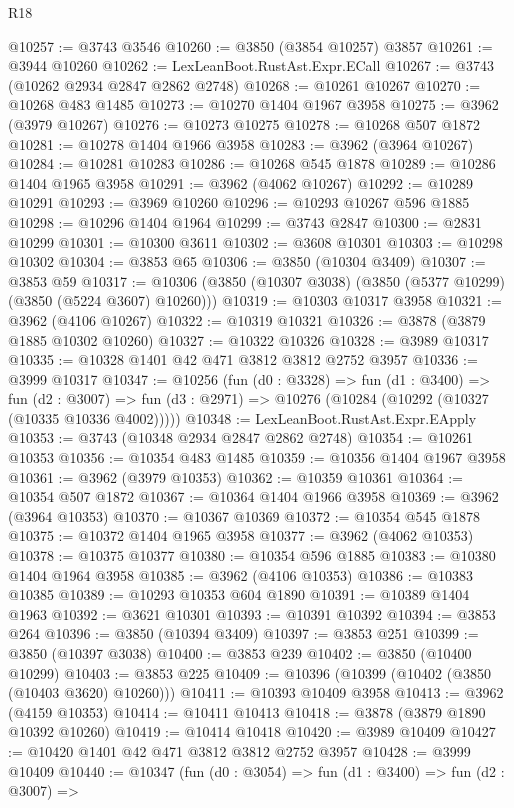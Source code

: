 \begin{lexlean}{R18}
\begin{coremodule}
@10257 := @3743 @3546
@10260 := @3850 (@3854 @10257) @3857
@10261 := @3944 @10260
@10262 := LexLeanBoot.RustAst.Expr.ECall
@10267 := @3743 (@10262 @2934 @2847 @2862 @2748)
@10268 := @10261 @10267
@10270 := @10268 @483 @1485
@10273 := @10270 @1404 @1967 @3958
@10275 := @3962 (@3979 @10267)
@10276 := @10273 @10275
@10278 := @10268 @507 @1872
@10281 := @10278 @1404 @1966 @3958
@10283 := @3962 (@3964 @10267)
@10284 := @10281 @10283
@10286 := @10268 @545 @1878
@10289 := @10286 @1404 @1965 @3958
@10291 := @3962 (@4062 @10267)
@10292 := @10289 @10291
@10293 := @3969 @10260
@10296 := @10293 @10267 @596 @1885
@10298 := @10296 @1404 @1964
@10299 := @3743 @2847
@10300 := @2831 @10299
@10301 := @10300 @3611
@10302 := @3608 @10301
@10303 := @10298 @10302
@10304 := @3853 @65
@10306 := @3850 (@10304 @3409)
@10307 := @3853 @59
@10317 := @10306 (@3850 (@10307 @3038) (@3850 (@5377 @10299) (@3850 (@5224 @3607) @10260)))
@10319 := @10303 @10317 @3958
@10321 := @3962 (@4106 @10267)
@10322 := @10319 @10321
@10326 := @3878 (@3879 @1885 @10302 @10260)
@10327 := @10322 @10326
@10328 := @3989 @10317
@10335 := @10328 @1401 @42 @471 @3812 @3812 @2752 @3957
@10336 := @3999 @10317
@10347 := @10256
    (fun (d0 : @3328) =>
    fun (d1 : @3400) =>
    fun (d2 : @3007) => fun (d3 : @2971) => @10276 (@10284 (@10292 (@10327 (@10335 @10336 @4002)))))
@10348 := LexLeanBoot.RustAst.Expr.EApply
@10353 := @3743 (@10348 @2934 @2847 @2862 @2748)
@10354 := @10261 @10353
@10356 := @10354 @483 @1485
@10359 := @10356 @1404 @1967 @3958
@10361 := @3962 (@3979 @10353)
@10362 := @10359 @10361
@10364 := @10354 @507 @1872
@10367 := @10364 @1404 @1966 @3958
@10369 := @3962 (@3964 @10353)
@10370 := @10367 @10369
@10372 := @10354 @545 @1878
@10375 := @10372 @1404 @1965 @3958
@10377 := @3962 (@4062 @10353)
@10378 := @10375 @10377
@10380 := @10354 @596 @1885
@10383 := @10380 @1404 @1964 @3958
@10385 := @3962 (@4106 @10353)
@10386 := @10383 @10385
@10389 := @10293 @10353 @604 @1890
@10391 := @10389 @1404 @1963
@10392 := @3621 @10301
@10393 := @10391 @10392
@10394 := @3853 @264
@10396 := @3850 (@10394 @3409)
@10397 := @3853 @251
@10399 := @3850 (@10397 @3038)
@10400 := @3853 @239
@10402 := @3850 (@10400 @10299)
@10403 := @3853 @225
@10409 := @10396 (@10399 (@10402 (@3850 (@10403 @3620) @10260)))
@10411 := @10393 @10409 @3958
@10413 := @3962 (@4159 @10353)
@10414 := @10411 @10413
@10418 := @3878 (@3879 @1890 @10392 @10260)
@10419 := @10414 @10418
@10420 := @3989 @10409
@10427 := @10420 @1401 @42 @471 @3812 @3812 @2752 @3957
@10428 := @3999 @10409
@10440 := @10347
    (fun (d0 : @3054) =>
    fun (d1 : @3400) =>
    fun (d2 : @3007) =>

\end{coremodule}
\end{lexlean}
